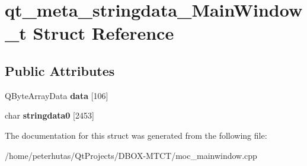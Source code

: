 \hypertarget{structqt__meta__stringdata___main_window__t}{}\section{qt\+\_\+meta\+\_\+stringdata\+\_\+\+Main\+Window\+\_\+t Struct Reference}
\label{structqt__meta__stringdata___main_window__t}
\subsection*{Public Attributes}
\begin{DoxyCompactItemize}
\item 
\mbox{\label{structqt__meta__stringdata___main_window__t_ade15c376b48d660b71fd7520c54e8166}} 
Q\+Byte\+Array\+Data {\bfseries data} \mbox{[}106\mbox{]}
\item 
\mbox{\label{structqt__meta__stringdata___main_window__t_a7b40934bb03969c4632626fc1952986b}} 
char {\bfseries stringdata0} \mbox{[}2453\mbox{]}
\end{DoxyCompactItemize}


The documentation for this struct was generated from the following file\+:\begin{DoxyCompactItemize}
\item 
/home/peterhutas/\+Qt\+Projects/\+D\+B\+O\+X-\/\+M\+T\+C\+T/moc\+\_\+mainwindow.\+cpp\end{DoxyCompactItemize}
